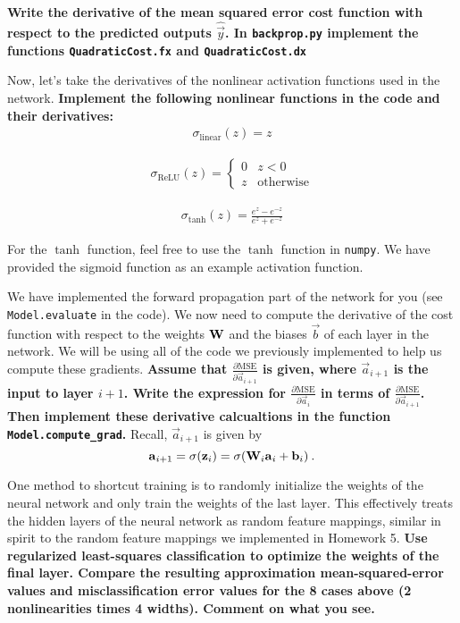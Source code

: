 \documentclass[preview]{standalone}
\begin{document}
\begin{Parts}
\textbf{Write the derivative of the mean squared error cost function with respect to the predicted outputs $\hat{\vec{y}}$.  In \texttt{backprop.py} implement the functions \texttt{QuadraticCost.fx} and \texttt{QuadraticCost.dx}}



\Part Now, let's take the derivatives of the nonlinear activation functions used in the network.  \textbf{Implement the following nonlinear functions in the code and their derivatives:}
\begin{align*}
\sigma_{\text{linear}}(z)=z
\end{align*}

\begin{align*}
\sigma_{\text{ReLU}}(z)=\begin{cases}0 & z<0 \\ z & \text{otherwise}\end{cases}
\end{align*}

\begin{align*}
\sigma_{\text{tanh}}(z)=\frac{e^z-e^{-z}}{e^z+e^{-z}}
\end{align*}

For the $\tanh$ function, feel free to use the $\tanh$ function in \texttt{numpy}.  We have provided the sigmoid function as an example activation function.





\Part We have implemented the forward propagation part of the network for you (see \texttt{Model.evaluate} in the code). We now need to compute the derivative of the cost function with respect to the weights $\mathbf{W}$ and the biases $\vec{b}$ of each layer in the network.  We will be using all of the code we previously implemented to help us compute these gradients.  \textbf{Assume that $\frac{\partial\text{MSE}}{\partial\vec{a}_{i+1}}$ is given, where $\vec{a}_{i+1}$ is the input to layer $i+1$.  Write the expression for $\frac{\partial\text{MSE}}{\partial \vec{a}_i}$ in terms of $\frac{\partial\text{MSE}}{\partial\vec{a}_{i+1}}$.  Then implement these derivative calcualtions in the function \texttt{Model.compute\_grad}.}  Recall, $\vec{a}_{i+1}$ is given by
$$\boldsymbol{\mathbf{a}}_{i+1} = \sigma(\boldsymbol{\mathbf{z}}_i) = \sigma(\mathbf{W}_i\boldsymbol{\mathbf{a}}_i+\boldsymbol{\mathbf{b}}_i) \:.$$



\Part
One method to shortcut training is to randomly initialize the weights of the neural network
and only train the weights of the last layer. This effectively treats the hidden layers of the neural
network as random feature mappings, similar in spirit to the random feature mappings we implemented in Homework 5.
{\bf Use regularized least-squares classification to optimize the weights of the final layer.
Compare the
resulting approximation mean-squared-error values  and misclassification error
values for the 8 cases above (2 nonlinearities times 4 widths). Comment on what
you see.}




\end{Parts}
\end{document}
